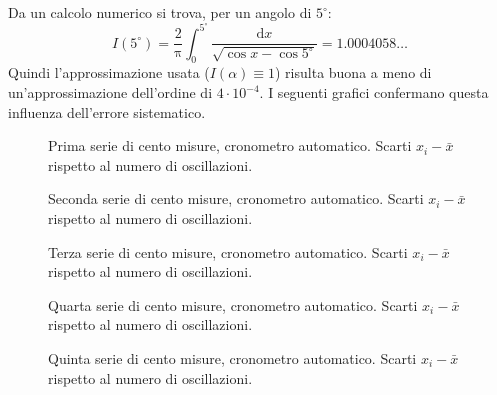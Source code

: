 \documentclass[italian,a4paper]{article}
\newcommand{\di}{\mathrm{d}} %
\renewcommand{\pi}{\uppi} %
\begin{document}
Da un calcolo numerico si trova, per un angolo di $5^\circ$:
\begin{equation*}
 I(5^\circ)=\dfrac 2 \pi \int_0^{5^\circ} \dfrac{\di x}{\sqrt{\cos x - \cos 5^\circ}} = 1.0004058\dots
\end{equation*}
Quindi l'approssimazione usata ($I(\alpha) \equiv 1$) risulta buona a meno di un'approssimazione dell'ordine di $4\cdot10^{-4}$. I seguenti grafici confermano questa influenza dell'errore sistematico.
\begin{figure}[h]
\centering
\caption{Prima serie di cento misure, cronometro automatico. Scarti $x_i - \bar{x}$ rispetto al numero di oscillazioni.}\label{scarti1}
 
\end{figure}
\begin{figure}[h]
\centering
\caption{Seconda serie di cento misure, cronometro automatico. Scarti $x_i - \bar{x}$ rispetto al numero di oscillazioni.}\label{scarti2}
 
\end{figure}
\begin{figure}[h]
\centering
\caption{Terza serie di cento misure, cronometro automatico. Scarti $x_i - \bar{x}$ rispetto al numero di oscillazioni.}\label{scarti3}
 
\end{figure}
\begin{figure}[h]
\centering
\caption{Quarta serie di cento misure, cronometro automatico. Scarti $x_i - \bar{x}$ rispetto al numero di oscillazioni.}\label{scarti4}
 
\end{figure}
\begin{figure}[h]
\centering
\caption{Quinta serie di cento misure, cronometro automatico. Scarti $x_i - \bar{x}$ rispetto al numero di oscillazioni.}\label{scarti5}
 
\end{figure}
\end{document}
